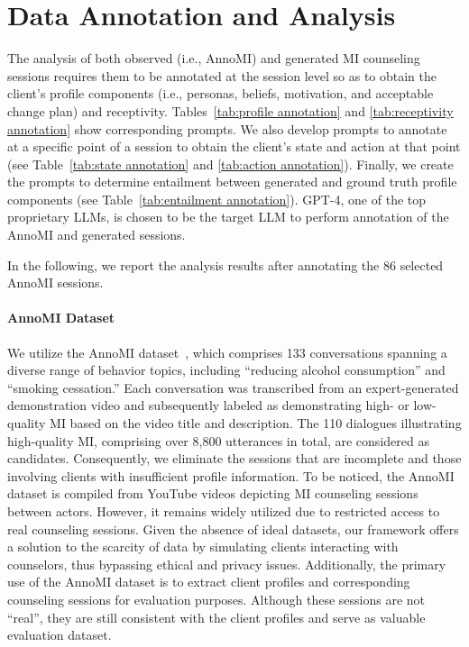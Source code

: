 \section{Data Annotation and Analysis}
\label{app:data annotation}

The analysis of both observed (i.e., AnnoMI) and generated MI counseling sessions requires them to be annotated at the session level so as to obtain the client's profile components (i.e., personas, beliefs, motivation, and acceptable change plan) and receptivity.  Tables~\ref{tab:profile annotation} and \ref{tab:receptivity annotation} show corresponding prompts.  We also develop prompts to annotate at a specific point of a session to obtain the client's state and action at that point (see Table~\ref{tab:state annotation} and \ref{tab:action annotation}).  Finally, we create the prompts to determine entailment between generated and ground truth profile components (see Table~\ref{tab:entailment annotation}).  
GPT-4, one of the top proprietary LLMs, is chosen to be the target LLM to perform annotation of the AnnoMI and generated sessions.

In the following, we report the analysis results after annotating the 86 selected AnnoMI sessions.

\paragraph{AnnoMI Dataset} We utilize the AnnoMI dataset~\citep{wu2022anno}, which comprises 133 conversations spanning a diverse range of behavior topics, including ``reducing alcohol consumption'' and ``smoking cessation.'' Each conversation was transcribed from an expert-generated demonstration video and subsequently labeled as demonstrating high- or low-quality MI based on the video title and description. The 110 dialogues illustrating high-quality MI, comprising over 8,800 utterances in total, are considered as candidates. Consequently, we eliminate the sessions that are incomplete and those involving clients with insufficient profile information. To be noticed, the AnnoMI dataset is compiled from YouTube videos depicting MI counseling sessions between actors. However, it remains widely utilized due to restricted access to real counseling sessions. Given the absence of ideal datasets, our framework offers a solution to the scarcity of data by simulating clients interacting with counselors, thus bypassing ethical and privacy issues. Additionally, the primary use of the AnnoMI dataset is to extract client profiles and corresponding counseling sessions for evaluation purposes. Although these sessions are not “real”, they are still consistent with the client profiles and serve as valuable evaluation dataset.

